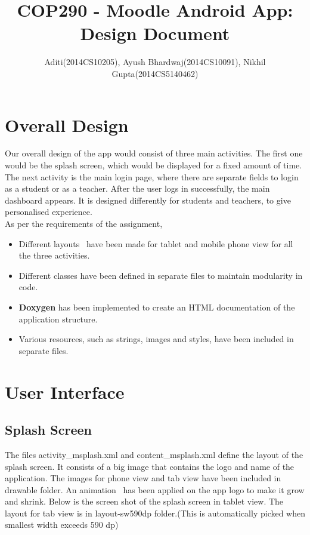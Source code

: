 \documentclass{article}
\begin{document}
\title{COP290 - Moodle Android App: Design Document}
\author{ Aditi(2014CS10205), Ayush Bhardwaj(2014CS10091), Nikhil Gupta(2014CS5140462)}

\maketitle

\section{Overall Design}

Our overall design of the app would consist of three main activities. The first one would be the splash screen, which would be displayed for a fixed amount of time. The next activity is the main login page, where there are separate fields to login as a student or as a teacher. After the user logs in successfully, the main dashboard appears. It is designed differently for students and teachers, to give personalised experience.\\
As per the requirements of the assignment,
\begin{itemize}
\item Different layouts~\cite{multiple_screen_sizes} have been made for tablet and mobile phone view for all the three activities.
\item Different classes have been defined in separate files to maintain modularity in code.
\item \textbf{Doxygen} has been implemented to create an HTML documentation of the application structure.
\item Various resources, such as strings, images and styles, have been included in separate files.
\end{itemize} 

\section{User Interface}
\subsection{Splash Screen} The files activity\_msplash.xml and content\_msplash.xml define the layout of the splash screen. It consists of a big image that contains the logo and name of the application. The images for phone view and tab view have been included in drawable folder. An animation~\cite{animations} has been applied on the app logo to make it grow and shrink. Below is the screen shot of the splash screen in tablet view. The layout for tab view is in layout-sw590dp folder.(This is automatically picked when smallest width exceeds 590 dp)
\end{document}
